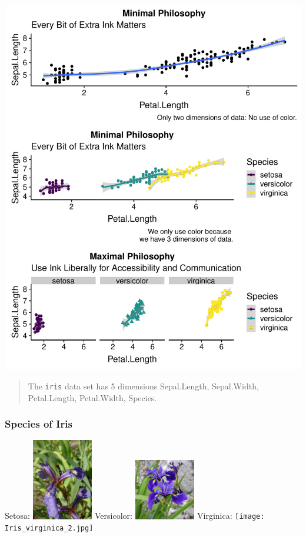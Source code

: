 \documentclass[
]{article}
\begin{document}
\includegraphics{design_files/figure-latex/unnamed-chunk-10-1.pdf}

\begin{quote}
The \texttt{iris} data set has 5 dimensions Sepal.Length, Sepal.Width,
Petal.Length, Petal.Width, Species.
\end{quote}

\hypertarget{species-of-iris}{%
\subsubsection{Species of Iris}\label{species-of-iris}}

Setosa:
\includegraphics[width=0.2\textwidth,height=\textheight]{Kosaciec_szczecinkowaty_Iris_setosa.jpg}
Versicolor:
\includegraphics[width=0.2\textwidth,height=\textheight]{Blue_Flag_Ottawa.jpg}
Virginica:
\texttt{[image: Iris\_virginica\_2.jpg]}
\end{document}
